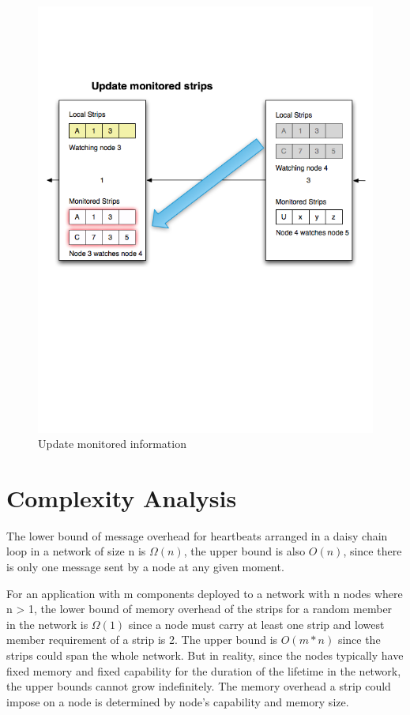 \begin{figure}[h!]
\centering
    \includegraphics[width=\linewidth]{figures/strip10}
\caption{Update monitored information}
\label{fig:strip10}
\end{figure}

\section{Complexity Analysis}

The lower bound of message overhead for heartbeats arranged in a daisy chain
loop in a network of size n is $\Omega(n)$, the upper bound is also $O(n)$, since
there is only one message sent by a node at any given moment.

For an application with m components deployed to a network with n nodes where
n > 1, the lower bound of memory overhead of the strips for a random member in
the network is $\Omega(1)$ since a node must carry at least one strip and lowest
member requirement of a strip is 2. The upper bound is $O(m*n)$ since the strips
could span the whole network. But in reality, since the nodes typically have
fixed memory and fixed capability for the duration of the lifetime in the
network, the upper bounds cannot grow indefinitely. The memory overhead a strip
could impose on a node is determined by node's capability and memory size.


